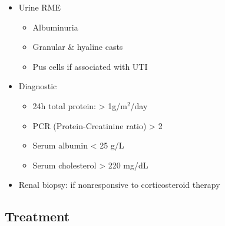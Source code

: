 \documentclass[
  12pt,
]{memoir}
\providecommand{\tightlist}{%
  \setlength{\itemsep}{0pt}\setlength{\parskip}{0pt}}
\begin{document}
\begin{itemize}
\tightlist
\item
  Urine RME

  \begin{itemize}
  \tightlist
  \item
    Albuminuria
  \item
    Granular \& hyaline casts
  \item
    Pus cells if associated with UTI
  \end{itemize}
\item
  Diagnostic

  \begin{itemize}
  \tightlist
  \item
    24h total protein: \textgreater{} 1g/m\(^2\)/day
  \item
    PCR (Protein-Creatinine ratio) \textgreater{} 2
  \item
    Serum albumin \textless{} 25 g/L
  \item
    Serum cholesterol \textgreater{} 220 mg/dL
  \end{itemize}
\item
  Renal biopsy: if nonresponsive to corticosteroid therapy
\end{itemize}

\hypertarget{treatment-1}{%
\subsection{Treatment}\label{treatment-1}}
\end{document}
